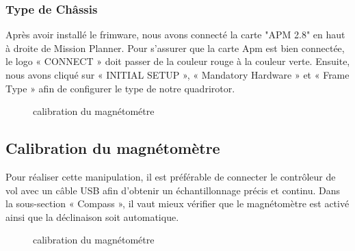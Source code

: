 	\subsubsection{Type de Châssis}
	Après avoir installé le frimware, nous avons connecté  la carte "APM 2.8" en haut à droite de Mission Planner. Pour s'assurer que la carte Apm est bien connectée, le logo « CONNECT » doit passer de la couleur rouge à la couleur verte. Ensuite, nous avons cliqué sur « INITIAL SETUP », « Mandatory Hardware » et « Frame Type » afin de configurer le type de notre quadrirotor. 
	\begin{figure}[h]
		\begin{center}
			\centering
		\end{center}
		\caption{calibration du magnétométre}
	\end{figure}
	\subsection{Calibration du magnétomètre}
	Pour réaliser cette manipulation, il est préférable de connecter le contrôleur de vol avec un câble USB afin d’obtenir un échantillonnage précis et continu.
	Dans la sous-section « Compass », il vaut mieux vérifier que le magnétomètre est activé ainsi que la déclinaison soit automatique.
	
	\begin{figure}[h]
		\begin{center}
			\centering
		\end{center}
		\caption{calibration du magnétométre}
	\end{figure}
	
